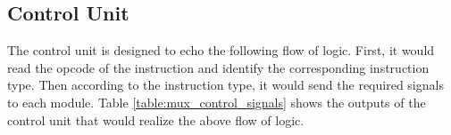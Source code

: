 \documentclass[12pt]{article}
\begin{document}
    \subsection{Control Unit}
    The control unit is designed to echo the following flow of logic.
    First, it would read the opcode of the instruction and identify the corresponding instruction type.
    Then according to the instruction type, it would send the required signals to each module.
    Table \ref{table:mux_control_signals} shows the outputs of the control unit that would realize the above flow of logic.
    \begin{table}[ht]
        \centering
\end{table}
\end{document}
